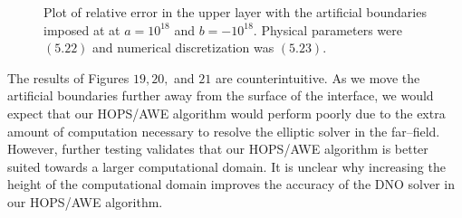 \vspace{-39mm}
\begin{figure}[H]
\vspace{3mm}
\caption{Plot of relative error in the upper layer with the artificial boundaries imposed at at $a=10^{18}$ and $b=-10^{18}$. Physical parameters were $(5.22)$ and numerical discretization was $(5.23)$.}
\label{Fig:Eps}
\end{figure}
\vspace{-16mm}
The results of Figures $19,20,$ and $21$ are counterintuitive. As we move the artificial boundaries further away from the surface of the interface, we would expect that our HOPS/AWE algorithm would perform poorly due to the extra amount of computation necessary to resolve the elliptic solver in the far--field. However, further testing validates that our HOPS/AWE algorithm is better suited towards a larger computational domain. It is unclear why increasing the height of the computational domain improves the accuracy of the DNO solver in our HOPS/AWE algorithm.